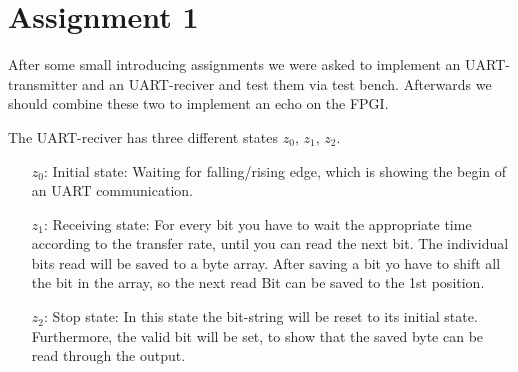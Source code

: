 \section*{Assignment 1}



After some small introducing assignments we were asked to implement an UART-transmitter and an UART-reciver and test them via test bench. Afterwards we should combine these two to implement an echo on the FPGI.


The UART-reciver has three different states $z_0$, $z_1$, $z_2$.
\begin{itemize}


\item[$z_0$:] Initial state: Waiting for falling/rising edge, which is showing the begin of an UART communication.
\item[$z_1$:] Receiving state: For every bit you have to wait the appropriate time according to the transfer rate, until you can read the next bit. The individual bits read will be saved to a byte array. After saving a bit yo have to shift all the bit in the array, so the next read Bit can be saved to the 1st position.
\item[$z_2$:] Stop state: In this state the bit-string will be reset to its initial state. Furthermore, the valid bit will be set, to show that the saved byte can be read through the output.
\end{itemize}

